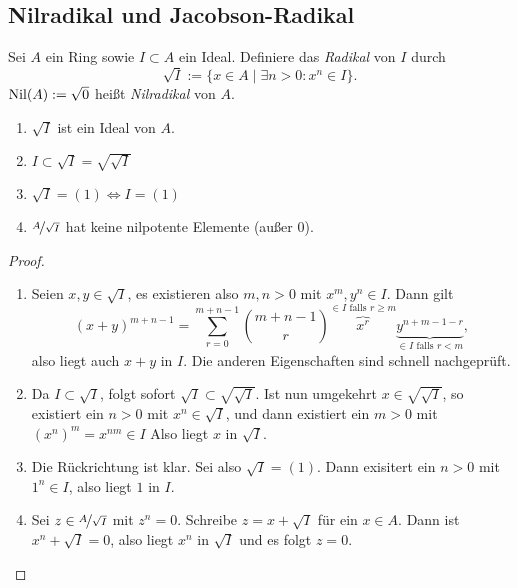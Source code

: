 \documentclass[12pt,a4paper]{scrartcl}
\theoremstyle{cplain}
\theoremstyle{cdef}
\begin{document}
\subsection{Nilradikal und Jacobson-Radikal}
\begin{defi}
    Sei $A$ ein Ring sowie $I\subset A$ ein Ideal. Definiere das \emph{Radikal} von $I$ durch \[\sqrt{I} := \{x\in A \mid \exists n>0: x^n\in I\}.\]
    $\operatorname{Nil}(A) := \sqrt{0}$ heißt \emph{Nilradikal} von $A$.
\end{defi}
\begin{lem}
    \leavevmode
    \begin{enumerate}
        \item $\sqrt{I}$ ist ein Ideal von $A$.
        \item $I\subset \sqrt{I} = \sqrt{\sqrt{I}}$
        \item $\sqrt{I} = (1) \Leftrightarrow I = (1)$
        \item $\nicefrac{A}{\sqrt{I}}$ hat keine nilpotente Elemente (außer 0).
    \end{enumerate}
    \begin{proof}
        \leavevmode
        \begin{enumerate}
            \item Seien $x, y\in \sqrt{I}$, es existieren also $m, n > 0$ mit $x^m, y^n\in I$. Dann gilt
            \[(x+y)^{m+n-1}=\sum_{r=0}^{m+n-1}{m+n-1 \choose r}\overbrace{x^r}^{\in I \text{ falls } r\geq m}\underbrace{y^{n+m-1-r}}_{\in I \text{ falls } r<m},\]
            also liegt auch $x+y$ in $I$. Die anderen Eigenschaften sind schnell nachgeprüft.
            \item Da $I\subset \sqrt{I}$, folgt sofort $\sqrt{I} \subset \sqrt{\sqrt{I}}$. Ist nun umgekehrt $x\in \sqrt{\sqrt{I}}$, so existiert ein $n>0$ mit $x^n\in \sqrt{I}$, und dann existiert ein $m>0$ mit $(x^n)^m = x^{nm} \in I$ Also liegt $x$ in $\sqrt{I}$.
            \item Die Rückrichtung ist klar. Sei also $\sqrt I=(1)$. Dann exisitert ein $n>0$ mit $1^n \in I$, also liegt $1$ in $I$.
            \item Sei $z\in \nicefrac{A}{\sqrt{I}}$ mit $z^n=0$. Schreibe $z=x+\sqrt{I}$ für ein $x\in A$. Dann ist $x^n+\sqrt{I} = 0$, also liegt $x^n$ in $\sqrt{I}$ und es folgt $z=0$.
            \qedhere
        \end{enumerate}
    \end{proof}
\end{lem}
\end{document}
